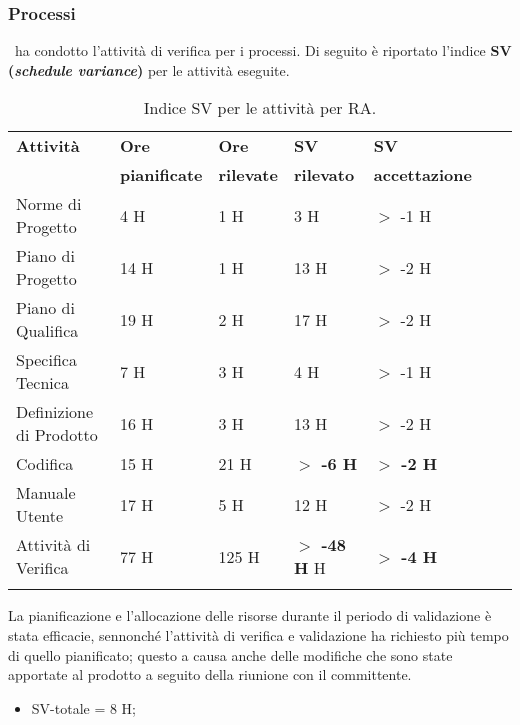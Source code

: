 \subsubsection{Processi}
\gruppo ~ha condotto l'attività di verifica per i processi. Di seguito è riportato l'indice \textbf{SV (\textit{schedule variance})} per le attività eseguite.
\begin{longtable}{lllllXr}
\toprule
\textbf{Attività} & \textbf{Ore} & \textbf{Ore} & \textbf{SV} & \textbf{SV} \\
& \textbf{pianificate} & \textbf{rilevate} & \textbf{rilevato} & \textbf{accettazione}\\
\toprule
Norme di Progetto & 4 H & 1 H & 3 H & $>$ -1 H\\
\midrule
Piano di Progetto & 14 H & 1 H & 13 H & $>$ -2 H\\
\midrule
Piano di Qualifica & 19 H & 2 H & 17 H & $>$ -2 H\\
\midrule
Specifica Tecnica & 7 H & 3 H & 4 H & $>$ -1 H\\
\midrule
Definizione di Prodotto & 16 H & 3 H & 13 H & $>$ -2 H\\
\midrule
Codifica & 15 H & 21 H & \textbf{$>$ -6 H} & \textbf{$>$ -2 H}\\
\midrule
Manuale Utente & 17 H & 5 H & 12 H & $>$ -2 H\\
\midrule
Attività di Verifica & 77 H & 125 H & \textbf{$>$ -48 H} H & \textbf{$>$ -4 H}\\
\bottomrule
\caption{Indice SV per le attività per RA.}
\end{longtable}
La pianificazione e l'allocazione delle risorse durante il periodo di validazione è stata efficacie, sennonché l'attività di verifica e validazione ha richiesto più tempo di quello pianificato; questo a causa anche delle modifiche che sono state apportate al prodotto a seguito della riunione con il committente.
\begin{itemize}
\item SV-totale = 8 H;
\end{itemize}

